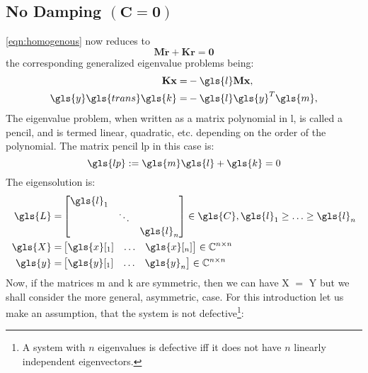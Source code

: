 \subsection{No Damping $ (\mathbf{C = 0})$}
\autoref{eqn:homogenous} now reduces to
\begin{equation}
	\mathbf{M\ddot{r} + Kr = 0} \label{eqn:no_damp}
\end{equation}
the corresponding generalized eigenvalue problems being:
\begin{subequations}
\label{eqn:eigen_problem}
\begin{align}
	\mathbf{Kx} =  &-\gls{l}\mathbf{Mx}, \label{eqn:eigen_problem_right}\\
	\gls{y}\gls{trans}\gls{k} =  &-\gls{l}\gls{y}^T\gls{m}, \label{eqn:eigen_problem_left}
\end{align}
\end{subequations}
The eigenvalue problem, when written as a matrix polynomial in \gls{l},
is called a pencil, and is termed linear, quadratic, etc. depending 
on the order of the polynomial. The matrix pencil \gls{lp} in this case is:
\begin{equation}
	\gls{lp} := \gls{m}\gls{l} + \gls{k} = 0 \label{eqn:linear_pencil}
\end{equation}
The eigensolution is:
\begin{align}
  \gls{L} = 
  	&\begin{bmatrix}
		\gls{l}_1 & & \\
		 & \ddots & \\
		 & & \gls{l}_n \\
	\end{bmatrix} \in \gls{C}, 
	\gls{l}_1 \geq \ldots \geq \gls{l}_n\\
	\gls{X} = 
 	&\begin{bmatrix}
		\gls{x}[_1] & \dots & \gls{x}[_n] 
	\end{bmatrix} \in \mathbb{C}^{n \times n}\\
	\gls{y} = 
 	&\begin{bmatrix}
		\gls{y}[_1] & \dots & \gls{y}_n
	\end{bmatrix} \in \mathbb{C}^{n \times n}
\end{align}
Now, if the matrices \gls{m} and \gls{k} are symmetric, then we
can have \gls{X} $=$ \gls{Y} but we shall consider the more general,
asymmetric,	case. For this introduction let us make an assumption, that the
system is not defective\footnote{A system with $n$ eigenvalues is defective 
iff it does not have $n$ linearly independent eigenvectors.}:

